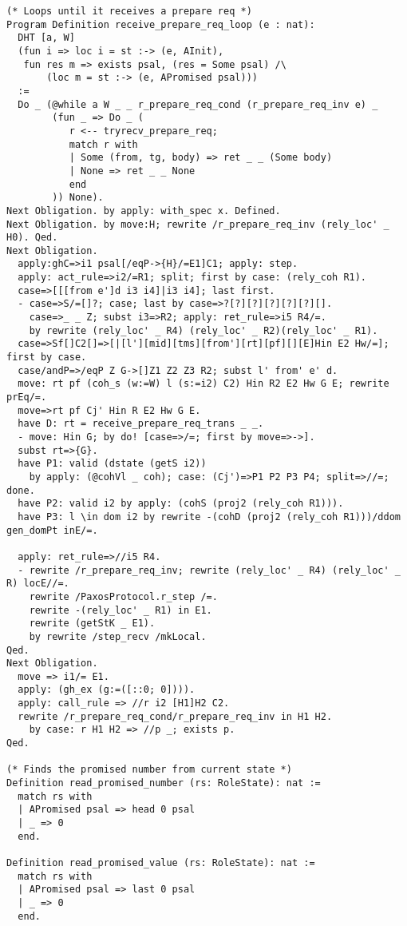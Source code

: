 \begin{landscape}
\begin{multicols*}{2}
\begin{lstlisting}[style=SourceCodeListing]
(* Loops until it receives a prepare req *)
Program Definition receive_prepare_req_loop (e : nat):
  DHT [a, W]
  (fun i => loc i = st :-> (e, AInit),
   fun res m => exists psal, (res = Some psal) /\
       (loc m = st :-> (e, APromised psal)))
  :=
  Do _ (@while a W _ _ r_prepare_req_cond (r_prepare_req_inv e) _
        (fun _ => Do _ (
           r <-- tryrecv_prepare_req;
           match r with
           | Some (from, tg, body) => ret _ _ (Some body)
           | None => ret _ _ None
           end
        )) None).
Next Obligation. by apply: with_spec x. Defined.
Next Obligation. by move:H; rewrite /r_prepare_req_inv (rely_loc' _ H0). Qed.
Next Obligation.
  apply:ghC=>i1 psal[/eqP->{H}/=E1]C1; apply: step.
  apply: act_rule=>i2/=R1; split; first by case: (rely_coh R1).
  case=>[[[from e']d i3 i4]|i3 i4]; last first.
  - case=>S/=[]?; case; last by case=>?[?][?][?][?][?][].
    case=>_ _ Z; subst i3=>R2; apply: ret_rule=>i5 R4/=.
    by rewrite (rely_loc' _ R4) (rely_loc' _ R2)(rely_loc' _ R1).
  case=>Sf[]C2[]=>[|[l'][mid][tms][from'][rt][pf][][E]Hin E2 Hw/=]; first by case.
  case/andP=>/eqP Z G->[]Z1 Z2 Z3 R2; subst l' from' e' d.
  move: rt pf (coh_s (w:=W) l (s:=i2) C2) Hin R2 E2 Hw G E; rewrite prEq/=.
  move=>rt pf Cj' Hin R E2 Hw G E.
  have D: rt = receive_prepare_req_trans _ _.
  - move: Hin G; by do! [case=>/=; first by move=>->].
  subst rt=>{G}.
  have P1: valid (dstate (getS i2))
    by apply: (@cohVl _ coh); case: (Cj')=>P1 P2 P3 P4; split=>//=; done.
  have P2: valid i2 by apply: (cohS (proj2 (rely_coh R1))).
  have P3: l \in dom i2 by rewrite -(cohD (proj2 (rely_coh R1)))/ddom gen_domPt inE/=.

  apply: ret_rule=>//i5 R4.
  - rewrite /r_prepare_req_inv; rewrite (rely_loc' _ R4) (rely_loc' _ R) locE//=.
    rewrite /PaxosProtocol.r_step /=.
    rewrite -(rely_loc' _ R1) in E1.
    rewrite (getStK _ E1).
    by rewrite /step_recv /mkLocal.
Qed.
Next Obligation.
  move => i1/= E1.
  apply: (gh_ex (g:=([::0; 0]))).
  apply: call_rule => //r i2 [H1]H2 C2.
  rewrite /r_prepare_req_cond/r_prepare_req_inv in H1 H2.
    by case: r H1 H2 => //p _; exists p.
Qed.

(* Finds the promised number from current state *)
Definition read_promised_number (rs: RoleState): nat :=
  match rs with
  | APromised psal => head 0 psal
  | _ => 0
  end.

Definition read_promised_value (rs: RoleState): nat :=
  match rs with
  | APromised psal => last 0 psal
  | _ => 0
  end.


\end{lstlisting}
\end{multicols*}
\end{landscape}
